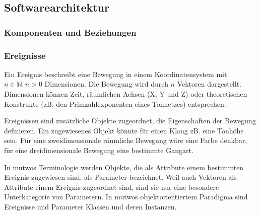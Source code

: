 \documentclass[12pt,a4paper,ngerman]{article}
\begin{document}


\subsection{Softwarearchitektur}

\subsubsection{Komponenten und Beziehungen}

\subsubsection{Ereignisse}

Ein Ereignis beschreibt eine Bewegung in einem Koordinatensystem mit $n\in\mathbb{N}:n>0$ Dimensionen.
Die Bewegung wird durch $n$ Vektoren dargestellt.
Dimensionen können Zeit, räumlichen Achsen (X, Y und Z) oder theoretischen Konstrukte (zB. den Primzahlexponenten eines Tonnetzes) entsprechen.

Ereignissen sind zusätzliche Objekte zugeordnet, die Eigenschaften der Bewegung definieren.
Ein zugewiesenes Objekt könnte für einen Klang zB. eine Tonhöhe sein.
Für eine zweidimensionale räumliche Bewegung wäre eine Farbe denkbar, für eine dreidimensionale Bewegung eine bestimmte Gangart.

In mutwos Terminologie werden Objekte, die als Attribute einem bestimmten Ereignis zugewiesen sind, als Parameter bezeichnet.
Weil auch Vektoren als Attribute einem Ereignis zugeordnet sind, sind sie nur eine besondere Unterkategorie von Parametern.
In mutwos objektorientiertem Paradigma sind Ereignisse und Parameter Klassen und deren Instanzen.


% 
\end{document}
